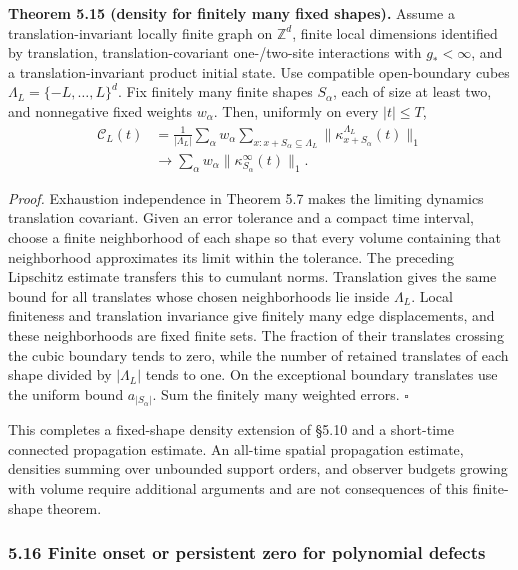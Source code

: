 \documentclass[
  11pt,
]{article}
\begin{document}
\textbf{Theorem 5.15 (density for finitely many fixed shapes).} Assume a
translation-invariant locally finite graph on \(\mathbb Z^d\), finite local
dimensions identified by translation, translation-covariant one-/two-site
interactions with \(g_*<\infty\), and a translation-invariant product initial
state. Use compatible open-boundary cubes \(\Lambda_L=\{-L,\ldots,L\}^d\).
Fix finitely many finite shapes \(S_\alpha\), each of size at least two, and
nonnegative fixed weights \(w_\alpha\). Then, uniformly on every \(|t|\le T\),
\[
\begin{aligned}
\mathcal C_L(t)&=\frac1{|\Lambda_L|}\sum_\alpha w_\alpha
   \sum_{x:x+S_\alpha\subseteq\Lambda_L}
                  \lVert \kappa_{x+S_\alpha}^{\Lambda_L}(t)\rVert_1\\
&\longrightarrow \sum_\alpha w_\alpha\lVert \kappa_{S_\alpha}^\infty(t)\rVert_1.
\end{aligned}
\]

\emph{Proof.} Exhaustion independence in Theorem 5.7 makes the limiting dynamics
translation covariant. Given an error tolerance and a compact time interval,
choose a finite neighborhood of each shape so that every volume containing
that neighborhood approximates its limit within the tolerance. The preceding
Lipschitz estimate transfers this to cumulant norms. Translation gives the
same bound for all translates whose chosen neighborhoods lie inside
\(\Lambda_L\). Local finiteness and translation invariance give finitely many
edge displacements, and these neighborhoods are fixed finite sets. The
fraction of their translates crossing the cubic boundary tends to zero, while
the number of retained translates of each shape divided by \(|\Lambda_L|\)
tends to one. On the exceptional boundary translates use the uniform bound
\(a_{|S_\alpha|}\). Sum the finitely many weighted errors. \(\square\)

This completes a fixed-shape density extension of §5.10 and a short-time
connected propagation estimate. An all-time spatial propagation estimate,
densities summing over unbounded support orders, and observer budgets growing
with volume require additional arguments and are not consequences of this
finite-shape theorem.

\subsubsection{5.16 Finite onset or persistent zero for polynomial defects}\label{finite-onset-or-persistent-zero-for-polynomial-defects}
\end{document}
